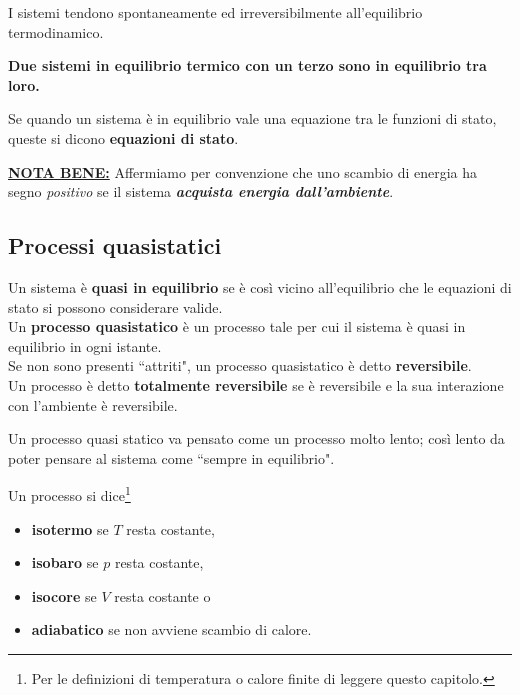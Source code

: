 \begin{remark}
I sistemi tendono spontaneamente ed irreversibilmente all'equilibrio termodinamico.
\end{remark}

\begin{fact}
\textbf{Due sistemi in equilibrio termico con un terzo sono in equilibrio tra loro.}
\end{fact}

\begin{definition}
Se quando un sistema \`e in equilibrio vale una equazione tra le funzioni di stato, queste si dicono \textbf{equazioni di stato}.
\end{definition}

\begin{remark}
\underline{\textbf{NOTA BENE:}} Affermiamo per convenzione che uno scambio di energia ha segno \textit{positivo} se il sistema \textbf{\textit{acquista energia dall'ambiente}}.
\end{remark}



\subsection{Processi quasistatici}

\begin{definition}
Un sistema \`e \textbf{quasi in equilibrio} se \`e cos\`i vicino all'equilibrio che le equazioni di stato si possono considerare valide.\\ 
Un \textbf{processo quasistatico} \`e un processo tale per cui il sistema \`e quasi in equilibrio in ogni istante.\\
Se non sono presenti ``attriti", un processo quasistatico \`e detto \textbf{reversibile}.\\
Un processo \`e detto \textbf{totalmente reversibile} se \`e reversibile e la sua interazione con l'ambiente \`e reversibile.
\end{definition}

\begin{remark}
Un processo quasi statico va pensato come un processo molto lento; cos\`i lento da poter pensare al sistema come ``sempre in equilibrio".
\end{remark}


\begin{definition}
Un processo si dice\footnote{Per le definizioni di temperatura o calore finite di leggere questo capitolo.}
\begin{itemize}
\item \textbf{isotermo} se $T$ resta costante,
\item \textbf{isobaro} se $p$ resta costante,
\item \textbf{isocore} se $V$ resta costante o
\item \textbf{adiabatico} se non avviene scambio di calore.
\end{itemize}
\end{definition}




